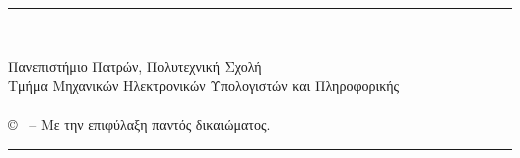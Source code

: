 \pagestyle{empty}

\vspace*{\fill}
\noindent \hspace{2cm} \rule{12.7cm}{0.4pt}\\
\vspace{-1.7em}
\begin{flushleft}
	\hspace*{30mm}Πανεπιστήμιο Πατρών, Πολυτεχνική Σχολή\\
	\hspace*{30mm}Τμήμα Μηχανικών Ηλεκτρονικών Υπολογιστών και Πληροφορικής\\
	\hspace*{30mm}{\nomme}\\
	\hspace*{30mm}© \monthyear \ -- Με την επιφύλαξη παντός δικαιώματος.\\
\end{flushleft}
\vspace{-1.2em}
\noindent \hspace{2cm} \rule{12.7cm}{0.4pt}

